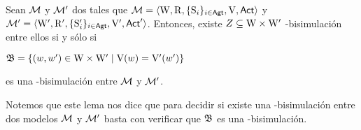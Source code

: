 






\begin{lema}\label{lema:bisim-existence}
    Sean $\mathcal{M}$ y $\mathcal{M}'$ dos \ultss tales que 
    $\mathcal{M}=\langle \mathrm{W},\mathrm{R},\{ \mathrm{S}_i \}_{i \in {\rm \sf Agt}},\mathrm{V},{\rm \sf Act} \rangle$ y 
    $\mathcal{M}'=\langle \mathrm{W}',\mathrm{R}',\{ \mathrm{S}_i' \}_{i \in {\rm \sf Agt}},\mathrm{V}',{\rm \sf Act}' \rangle$.
    Entonces, existe $Z \subseteq \mathrm{W} \times \mathrm{W}'$ \KHilogic-bisimulación entre ellos si y sólo si

    \begin{center}
        $\mathfrak{B} = \{(w,w') \in \mathrm{W} \times \mathrm{W}' \mid \mathrm{V}(w) = \mathrm{V}'(w')\}$
    \end{center}
    es una \KHilogic-bisimulación entre $\mathcal{M}$ y $\mathcal{M}'$.
\end{lema}

Notemos que este lema nos dice que para decidir si existe una \KHilogic-bisimulación
entre dos modelos $\mathcal{M}$ y $\mathcal{M}'$ basta con verificar que $\mathfrak{B}$ es una \KHilogic-bisimulación.

